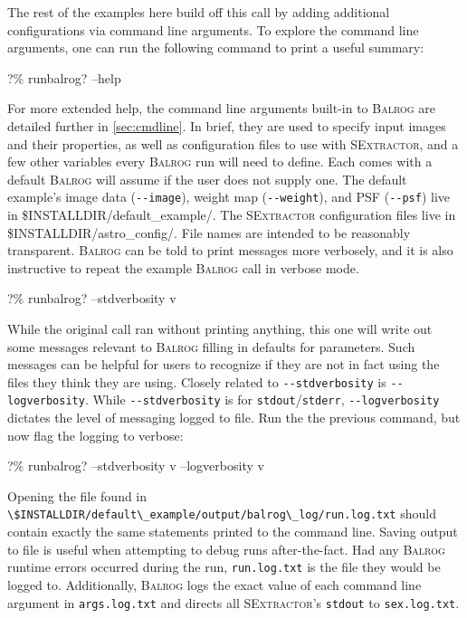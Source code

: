 \documentclass[12pt]{book}
\newcommand{\codett}[1]{\lstinline{#1}}
\newcommand{\balrog}{\textsc{Balrog}}
\newcommand{\sex}{\textsc{SExtractor}}
\newcommand{\opt}[1]{\codett{--#1}}
\newcommand{\bcmd}{\% runbalrog}
\begin{document}
\noindent The rest of the examples here build off this call by adding additional configurations via command line arguments.
To explore the command line arguments, one can run the following command to print a useful summary:

\begin{cmdline}
?\bcmd{}? --help
\end{cmdline}

\noindent For more extended help, the command line arguments built-in to \balrog{} are detailed further in \autoref{sec:cmdline}.
In brief, they are used to specify input images and their properties, as well as configuration
files to use with \sex{}, and a few other variables every \balrog{} run will need to define. 
Each comes with a default \balrog{} will assume if the user does not supply one.
The default example's image data (\opt{image}), 
weight map (\opt{weight}), 
and PSF (\opt{psf})
live in {\ttfamily \$INSTALLDIR/default\_example/}.
The \sex{} configuration files live in 
{\ttfamily \$INSTALLDIR/astro\_config/}. 
File names are intended to be reasonably transparent.
\balrog{} can be told to print messages more verbosely, 
and it is also instructive to repeat the example \balrog{} call in verbose mode.

\begin{cmdline}
?\bcmd{}? --stdverbosity v
\end{cmdline}

\noindent While the original call ran without printing anything, this one will write out some messages
relevant to \balrog{} filling in defaults for parameters.
Such messages can be helpful for users to recognize 
if they are not in fact using the files they think they are using.
Closely related to \opt{stdverbosity} is \opt{logverbosity}.
While \opt{stdverbosity} is for \codett{stdout}/\codett{stderr},
\opt{logverbosity} dictates the level of messaging logged to file.
Run the the previous command, but now flag the logging to verbose:

\begin{cmdline}
?\bcmd? --stdverbosity v --logverbosity v
\end{cmdline}

\noindent Opening the file found in \codett{\$INSTALLDIR/default\_example/output/balrog\_log/run.log.txt}
should contain exactly the same statements printed to the command line.
Saving output to file is useful when attempting to debug runs after-the-fact.
Had any \balrog{} runtime errors occurred during the run,
\codett{run.log.txt} is the file they would be logged to.
Additionally, \balrog{} logs the exact value of each command line argument  in \codett{args.log.txt}
and directs all \sex{}'s \codett{stdout} to \codett{sex.log.txt}.
\end{document}
